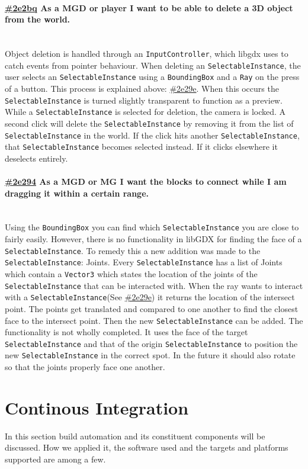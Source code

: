 \documentclass[10pt]{extarticle} %
\newcommand{\myparagraph}[1]{\paragraph{#1}\mbox{}\\} %
\def\code#1{\texttt{#1}}
\begin{document}
    \myparagraph{\href{\clickup{2e2bq}}{\#2e2bq} As a MGD or player I want to be able to delete a 3D object from the world.}
    Object deletion is handled through an \code{InputController}, which libgdx uses to catch events from pointer behaviour.
    When deleting an \code{SelectableInstance}, the user selects an \code{SelectableInstance} using a \code{BoundingBox} and a \code{Ray} on the press of a button. This process is explained above: \href{\clickup{2e29e}}{\#2e29e}.
    When this occurs the \code{SelectableInstance} is turned slightly transparent to function as a preview.
    While a \code{SelectableInstance} is selected for deletion, the camera is locked.
    A second click will delete the \code{SelectableInstance} by removing it from the list of \code{SelectableInstance} in the world.
    If the click hits another \code{SelectableInstance}, that \code{SelectableInstance} becomes selected instead.
    If it clicks elsewhere it deselects entirely.

    \myparagraph{\href{\clickup{2e294}}{\#2e294} As a MGD or MG I want the blocks to connect while I am dragging it within a certain range.}
    Using the \code{BoundingBox} you can find which \code{SelectableInstance} you are close to fairly easily.
    However, there is no functionality in libGDX for finding the face of a \code{SelectableInstance}.
    To remedy this a new addition was made to the \code{SelectableInstance}: Joints.
    Every \code{SelectableInstance} has a list of Joints which contain a \code{Vector3} which states the location of the joints of the \code{SelectableInstance} that can be interacted with.
    When the ray wants to interact with a \code{SelectableInstance}(See \href{\clickup{2e29e}}{\#2e29e}) it returns the location of the intersect point.
    The points get translated and compared to one another to find the closest face to the intersect point.
    Then the new \code{SelectableInstance} can be added.
    The functionality is not wholly completed.
    It uses the face of the target \code{SelectableInstance} and that of the origin \code{SelectableInstance} to position the new \code{SelectableInstance} in the correct spot.
    In the future it should also rotate so that the joints properly face one another.



    \newpage
    \section{Continous Integration}
    In this section build automation and its constituent components will be discussed.
    How we applied it, the software used and the targets and platforms supported are among a few.
\end{document}
